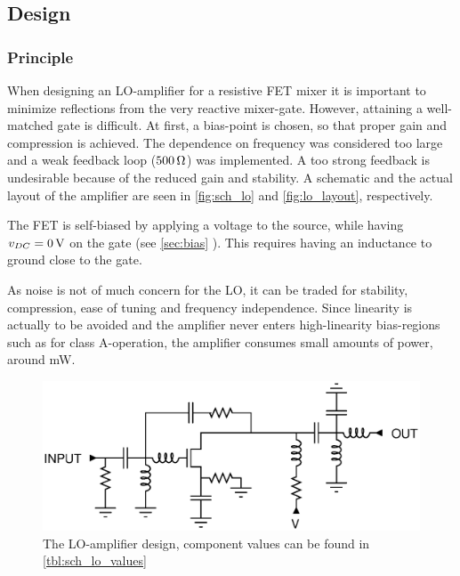 		\subsection{Design}
			\subsubsection{Principle}
				When designing an LO-amplifier for a resistive FET mixer it is important to minimize reflections from the very reactive mixer-gate. However, attaining a well-matched gate is difficult.\autocite{yhland1999} At first, a bias-point is chosen, so that proper gain and compression is achieved. The dependence on frequency was considered too large and a weak feedback loop ($\unit[500]{\Omega}$) was implemented. A too strong feedback is undesirable because of the reduced gain and stability. A schematic and the actual layout of the amplifier are seen in \autoref{fig:sch_lo} and \autoref{fig:lo_layout}, respectively.

				
	The FET is self-biased by applying a voltage to the source, while having $v_{DC}=\unit[0]{V}$ on the gate (see \ref{sec:bias} ). This requires having an inductance to ground close to the gate.

			 
			As noise is not of much concern for the LO, it can be traded for stability, compression, ease of tuning and frequency independence. Since linearity is actually to be avoided and the amplifier never enters high-linearity bias-regions such as for class A-operation, the amplifier consumes small amounts of power, around \unit[100]{mW}.




			\begin{figure}[hbt!]
				\centering
				\includegraphics[width=1.0\textwidth]{fig/amplifiers/lo/sch_lo}
				\caption[LO-amplifier schematic]{The LO-amplifier design, component values can be found in \autoref{tbl:sch_lo_values}}\label{fig:sch_lo}
			\end{figure}


